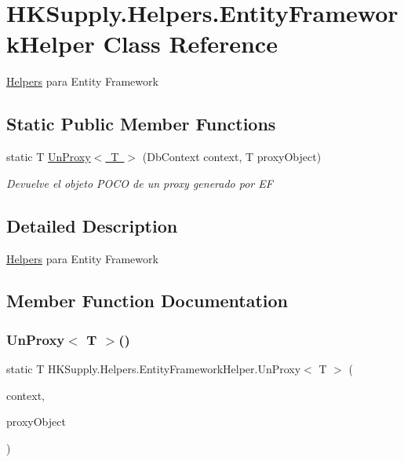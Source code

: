 \hypertarget{class_h_k_supply_1_1_helpers_1_1_entity_framework_helper}{}\section{H\+K\+Supply.\+Helpers.\+Entity\+Framework\+Helper Class Reference}
\label{class_h_k_supply_1_1_helpers_1_1_entity_framework_helper}


\mbox{\hyperlink{namespace_h_k_supply_1_1_helpers}{Helpers}} para Entity Framework  


\subsection*{Static Public Member Functions}
\begin{DoxyCompactItemize}
\item 
static T \mbox{\hyperlink{class_h_k_supply_1_1_helpers_1_1_entity_framework_helper_ad8b45e38c95a70d5c33b8a4a90ce50ae}{Un\+Proxy$<$ T $>$}} (Db\+Context context, T proxy\+Object)
\begin{DoxyCompactList}\small\item\em Devuelve el objeto P\+O\+CO de un proxy generado por EF \end{DoxyCompactList}\end{DoxyCompactItemize}


\subsection{Detailed Description}
\mbox{\hyperlink{namespace_h_k_supply_1_1_helpers}{Helpers}} para Entity Framework 



\subsection{Member Function Documentation}
\mbox{\label{class_h_k_supply_1_1_helpers_1_1_entity_framework_helper_ad8b45e38c95a70d5c33b8a4a90ce50ae}} 
\subsubsection{\texorpdfstring{Un\+Proxy$<$ T $>$()}{UnProxy< T >()}}
{\footnotesize\ttfamily static T H\+K\+Supply.\+Helpers.\+Entity\+Framework\+Helper.\+Un\+Proxy$<$ T $>$ (\begin{DoxyParamCaption}\item[{Db\+Context}]{context,  }\item[{T}]{proxy\+Object }\end{DoxyParamCaption})\hspace{0.3cm}{\ttfamily [static]}}



